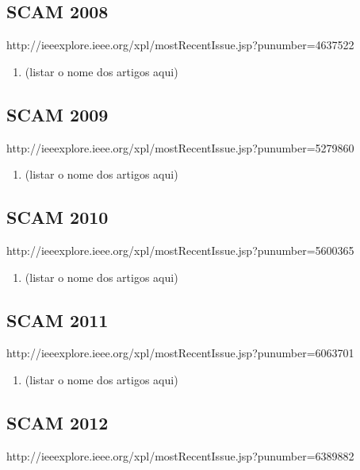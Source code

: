 \subsection{SCAM 2008}

http://ieeexplore.ieee.org/xpl/mostRecentIssue.jsp?punumber=4637522

\begin{enumerate}[itemsep=-1ex]
  \item (listar o nome dos artigos aqui)
\end{enumerate}

\subsection{SCAM 2009}

http://ieeexplore.ieee.org/xpl/mostRecentIssue.jsp?punumber=5279860

\begin{enumerate}[itemsep=-1ex]
  \item (listar o nome dos artigos aqui)
\end{enumerate}

\subsection{SCAM 2010}

http://ieeexplore.ieee.org/xpl/mostRecentIssue.jsp?punumber=5600365

\begin{enumerate}[itemsep=-1ex]
  \item (listar o nome dos artigos aqui)
\end{enumerate}

\subsection{SCAM 2011}

http://ieeexplore.ieee.org/xpl/mostRecentIssue.jsp?punumber=6063701

\begin{enumerate}[itemsep=-1ex]
  \item (listar o nome dos artigos aqui)
\end{enumerate}

\subsection{SCAM 2012}

http://ieeexplore.ieee.org/xpl/mostRecentIssue.jsp?punumber=6389882

